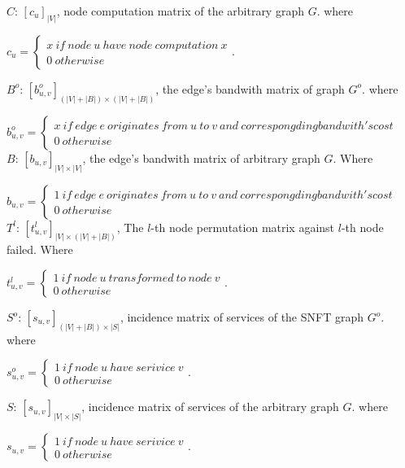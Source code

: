 $C$: $[c_{u}]_{|V|}$, node computation matrix of the arbitrary graph $G$. where

${c_{u}}=\left\{ \begin{array}{l}x\ if\ node\ u\ have\ node\ computation\ x\\
0\ otherwise
\end{array} \right.$.

$B^o$: $[b^o_{u,v}]_{(|V|+|B|)\times (|V|+|B|)}$, the edge's bandwith matrix of graph $G^o$. where

${b^o_{u,v}}=\left\{ \begin{array}{l}
x\ if\ edge\ e\ originates\ from\ u\ to\ v\ and\ correspongding bandwith's cost\\
0\ otherwise
\end{array} \right.$ \\

$B$: $[b_{u,v}]_{|V|\times |V|}$, the edge's bandwith matrix of arbitrary graph $G$. Where

${b_{u,v}}=\left\{ \begin{array}{l}
1\ if\ edge\ e\ originates\ from\ u\ to\ v\ and\ correspongding bandwith's cost\\
0\ otherwise
\end{array} \right.$ \\

$T^{l}$: $[t^l_{u,v}]_{|V|\times (|V|+|B|)}$, The $l$-th node permutation matrix against $l$-th node failed. Where

${t^l_{u,v}}=\left\{ \begin{array}{l}1\ if\ node\ u\ transformed\ to\ node\ v\\
0\ otherwise
\end{array} \right.$.

$S^o$: $[s_{u,v}]_{(|V|+|B|)\times |S|}$, incidence matrix of services of the SNFT graph $G^o$. where

${s^o_{u,v}}=\left\{ \begin{array}{l}1\ if\ node\ u\ have\ serivice\ v\\
0\ otherwise
\end{array} \right.$.

$S$: $[s_{u,v}]_{|V|\times |S|}$, incidence matrix of services of the arbitrary graph $G$. where

${s_{u,v}}=\left\{ \begin{array}{l}1\ if\ node\ u\ have\ serivice\ v\\
0\ otherwise
\end{array} \right.$.

